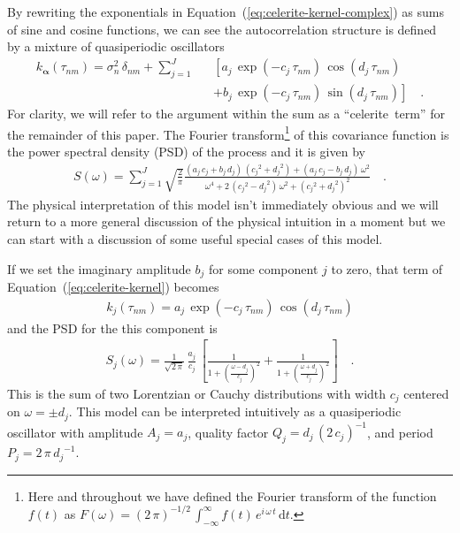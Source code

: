 \documentclass[manuscript, letterpaper]{aastex6}
\newcommand{\project}[1]{\textsf{#1}}
\newcommand{\celerite}{\project{celerite}}
\renewcommand{\eqref}[1]{\ref{eq:#1}}
\newcommand{\Eq}[1]{Equation~(\eqref{#1})}
\newcommand{\eq}[1]{\Eq{#1}}
\newcommand{\eqlabel}[1]{\label{eq:#1}}
\newcommand{\dd}{\ensuremath{\,\mathrm{d}}}
\newcommand{\bvec}[1]{{\ensuremath{\boldsymbol{#1}}}}
\begin{document}
By rewriting the exponentials in \eq{celerite-kernel-complex} as sums of sine
and cosine functions, we can see the autocorrelation structure is defined by a
mixture of quasiperiodic oscillators
\begin{eqnarray}\eqlabel{celerite-kernel}
k_\bvec{\alpha}(\tau_{nm}) = \sigma_n^2\,\delta_{nm} +
    \sum_{j=1}^J &&\left[
    a_j\,\exp\left(-c_j\,\tau_{nm}\right)\,\cos\left(d_j\,\tau_{nm}\right)
        \right.\nonumber\\
    &&+ \left.
    b_j\,\exp\left(-c_j\,\tau_{nm}\right)\,\sin\left(d_j\,\tau_{nm}\right)
\right] \quad.
\end{eqnarray}
For clarity, we will refer to the argument within the sum as a ``\celerite\
term'' for the remainder of this paper.
The Fourier transform\footnote{Here and throughout we have defined the Fourier
transform of the function $f(t)$ as $F(\omega)={(2\,\pi)}^{-1/2}\,
\int_{-\infty}^\infty f(t)\,e^{i\,\omega\,t}\dd t$.} of this covariance
function is the power spectral density (PSD) of the process and it is given by
\begin{eqnarray}\eqlabel{celerite-psd}
S(\omega) = \sum_{j=1}^J \sqrt{\frac{2}{\pi}}
\frac{(a_j\,c_j+b_j\,d_j)\,({c_j}^2+{d_j}^2)+(a_j\,c_j-b_j\,d_j)\,\omega^2}
{\omega^4+2\,({c_j}^2-{d_j}^2)\,\omega^2+{({c_j}^2+{d_j}^2)}^2}\quad.
\end{eqnarray}
The physical interpretation of this model isn't immediately obvious and we
will return to a more general discussion of the physical intuition in a moment
but we can start with a discussion of some useful special cases of this model.

If we set the imaginary amplitude $b_j$ for some component $j$ to zero, that
term of \eq{celerite-kernel} becomes
\begin{eqnarray}
k_j(\tau_{nm}) =
    a_j\,\exp\left(-c_j\,\tau_{nm}\right)\,\cos\left(d_j\,\tau_{nm}\right)
\end{eqnarray}
and the PSD for the this component is
\begin{eqnarray}\eqlabel{lorentz-psd}
S_j(\omega) = \frac{1}{\sqrt{2\,\pi}}\,\frac{a_j}{c_j}\,\left[
    \frac{1}{1+{\left(\frac{\omega-d_j}{c_j}\right)}^2} +
    \frac{1}{1+{\left(\frac{\omega+d_j}{c_j}\right)}^2}
\right] \quad.
\end{eqnarray}
This is the sum of two Lorentzian or Cauchy distributions with width $c_j$
centered on $\omega = \pm d_j$.
This model can be interpreted intuitively as a quasiperiodic oscillator with
amplitude $A_j = a_j$, quality factor $Q_j = d_j\,{(2\,c_j)}^{-1}$, and period
$P_j = 2\,\pi\,{d_j}^{-1}$.
\end{document}
